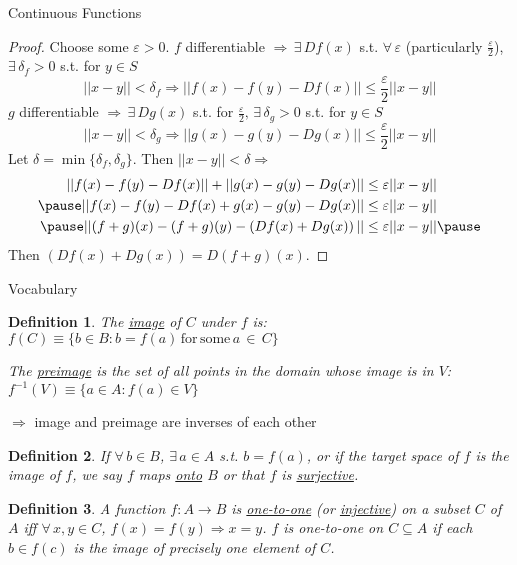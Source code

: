 \documentclass[xcolor=dvipsnames, compress, t]{beamer}
\newtheorem{defin}{Definition}
\newcommand{\vf}{\vspace{5pt}}
\begin{document}
\begin{frame}{Continuous Functions}

\begin{proof}
Choose some $\varepsilon > 0$.  $f$ differentiable \pause$\Rightarrow \, \exists \, D f(x)$ s.t. $\forall \, \varepsilon$ (particularly $\frac{\varepsilon}{2}$), $\exists \, \delta_f > 0$ s.t. for $y \in S$ \vspace{-10pt}$$||x-y||<\delta_f \Rightarrow ||f(x) - f(y) - Df(x) || \leq \frac{\varepsilon}{2} || x- y||$$ \pause
$g$ differentiable $\Rightarrow \, \exists \, D g(x)$ s.t. for $\frac{\varepsilon}{2}, \, \exists \, \delta_g > 0$ s.t. for $y \in S$ \vspace{-10pt} $$||x-y|| < \delta_g \Rightarrow ||g(x) - g(y) - D g(x) || \leq \frac{\varepsilon}{2} ||x - y||$$ \pause
Let $\delta = \min \{\delta_f, \delta_g\}$. \pause Then $||x-y|| < \delta \Rightarrow$ \vspace{-10pt}
\begin{equation*}
\begin{aligned}
||f(x) - f(y) - Df(x) || + ||g(x) - g(y) - Dg(x) || &\leq \varepsilon ||x-y|| \\ \pause
||f(x) - f(y) - Df(x) + g(x) -g(y) - Dg(x) || &\leq \varepsilon ||x-y|| \\ \pause
||(f+g) (x) - (f+g)(y) - \left( Df(x) + Dg(x) \right) || &\leq \varepsilon ||x-y|| \pause
\end{aligned}
\end{equation*}
Then $\left( Df(x) + Dg(x) \right) = D(f+g)(x)$.
\end{proof}

\end{frame}

\begin{frame}{Vocabulary}

\begin{defin} The \underline{image} of $C$ under $f$ is: $f(C) \equiv \{ b\in B: b= f(a) \, \mathrm{for \, some} \, a \, \in \, C\}$

\vf The \underline{preimage} is the set of all points in the domain whose image is in $V$: $f^{-1}(V) \equiv \{a \in A: f(a) \in V\}$\end{defin} \pause

$\Rightarrow$ image and preimage are inverses of each other \pause

\begin{defin}
If $\forall \, b \in B$, $\exists \, a \in A$ s.t. $b= f(a)$, or if the target space of $f$ is the image of $f$, we say $f$ maps \underline{onto} $B$ or that $f$ is \underline{surjective}.
\end{defin} \pause

\begin{defin}
A function $f: A \rightarrow B$ is \underline{one-to-one} (or \underline{injective}) on a subset $C$ of $A$ iff $\forall \, x, y \in C$, $f(x) = f(y) \Rightarrow x = y$.  $f$ is one-to-one on $C \subseteq A$ if each $b \in f(c)$ is the image of precisely one element of $C$.
\end{defin}

\end{frame}
\end{document}
